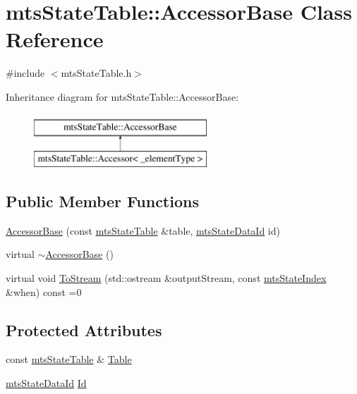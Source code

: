 \hypertarget{classmts_state_table_1_1_accessor_base}{\section{mts\-State\-Table\-:\-:Accessor\-Base Class Reference}
\label{classmts_state_table_1_1_accessor_base}
}


{\ttfamily \#include $<$mts\-State\-Table.\-h$>$}

Inheritance diagram for mts\-State\-Table\-:\-:Accessor\-Base\-:\begin{figure}[H]
\begin{center}
\leavevmode
\includegraphics[height=2.000000cm]{da/d7f/classmts_state_table_1_1_accessor_base}
\end{center}
\end{figure}
\subsection*{Public Member Functions}
\begin{DoxyCompactItemize}
\item 
\hyperlink{classmts_state_table_1_1_accessor_base_adbc83cfe2eaaf91a3ff45d99be72d22f}{Accessor\-Base} (const \hyperlink{classmts_state_table}{mts\-State\-Table} \&table, \hyperlink{mts_state_table_8h_ac3a0e34e8991d51790b043fa01857a35}{mts\-State\-Data\-Id} id)
\item 
virtual \hyperlink{classmts_state_table_1_1_accessor_base_aeb87141f3b26f9e27b28a63603e326f9}{$\sim$\-Accessor\-Base} ()
\item 
virtual void \hyperlink{classmts_state_table_1_1_accessor_base_afe801a46c5a1982b1d03e36d3dd0f16d}{To\-Stream} (std\-::ostream \&output\-Stream, const \hyperlink{classmts_state_index}{mts\-State\-Index} \&when) const =0
\end{DoxyCompactItemize}
\subsection*{Protected Attributes}
\begin{DoxyCompactItemize}
\item 
const \hyperlink{classmts_state_table}{mts\-State\-Table} \& \hyperlink{classmts_state_table_1_1_accessor_base_a97d6abbfe4149895b84e07f6131ccd3d}{Table}
\item 
\hyperlink{mts_state_table_8h_ac3a0e34e8991d51790b043fa01857a35}{mts\-State\-Data\-Id} \hyperlink{classmts_state_table_1_1_accessor_base_af799080a0ce46c1243f9b19145d7ca31}{Id}
\end{DoxyCompactItemize}


